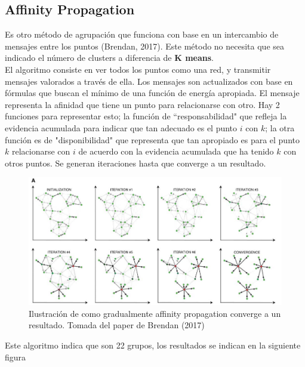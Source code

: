 \documentclass[12pt,spanish]{article}
\begin{document}
	\subsection{Affinity Propagation}
	Es otro método de agrupación que funciona con base en un intercambio de mensajes entre los puntos (Brendan, 2017). Este método no necesita que sea indicado el número de clusters a diferencia de \textbf{K means}.\\
	El algoritmo consiste en ver todos los puntos como una red, y transmitir mensajes valorados a través de ella. Los mensajes son actualizados con base en fórmulas que buscan el mínimo de una función de energía apropiada. El mensaje representa la afinidad que tiene un punto para relacionarse con otro. Hay 2 funciones para representar esto; la función de ``responsabilidad" que refleja la evidencia acumulada para indicar que tan adecuado es el punto $i$ con $k$; la otra función es de "disponibilidad" que representa que tan apropiado es para el punto $k$ relacionarse con $i$ de acuerdo con la evidencia acumulada que ha tenido $k$ con otros puntos. Se generan iteraciones hasta que converge a un resultado.
	\begin{figure}[H]
		\centering
		\includegraphics[width=15cm]{Imagenes/ap_funcionamiento.png}
		\begin{centering}
			\caption{Ilustración de como gradualmente affinity propagation converge a un resultado. Tomada del paper de Brendan (2017)}
		\end{centering}
	\end{figure}
	Este algoritmo indica que son 22 grupos, los resultados se indican en la siguiente figura
\end{document}

